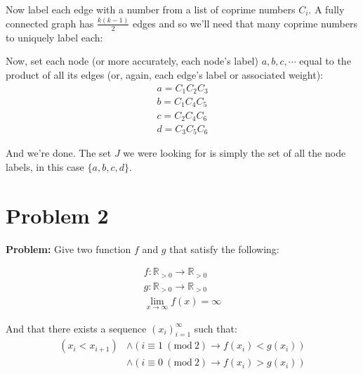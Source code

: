 \documentclass{article}
\newcommand{\Mod}[1]{\ (\mathrm{mod}\ #1)}
\begin{document}
Now label each edge with a number from a list of coprime numbers $C_i$. A fully connected graph has $\frac{k(k-1)}{2}$ edges and so we'll need that many coprime numbers to uniquely label each:

\begin{center}
\end{center}

Now, set each node (or more accurately, each node's label) $a,b,c,\cdots$ equal to the product of all its edges (or, again, each edge's label or associated weight):
\begin{gather*}
  a = C_1 C_2C_3 \\
  b = C_1 C_4C_5 \\
  c = C_2 C_4C_6 \\
  d = C_3 C_5C_6
\end{gather*}

And we're done. The set $J$ we were looking for is simply the set of all the node labels, in this case $\{a,b,c,d\}$.

\section{Problem 2}
\textbf{Problem:} Give two function $f$ and $g$ that satisfy the following:

\begin{gather*}
  f:\mathbb{R}_{>0}\to\mathbb{R}_{>0} \\
  g:\mathbb{R}_{>0}\to\mathbb{R}_{>0} \\
  \lim_{x\to\infty}f(x)=\infty
\end{gather*}

And that there exists a sequence $\left(x_i\right)_{i=1}^{\infty}$ such that:
\begin{align*}
\left(x_i<x_{i+1}\right)&\wedge\left(i\equiv 1\Mod{2}\rightarrow f(x_i)<g(x_i)\right)\\
&\wedge\left(i\equiv 0\Mod{2}\rightarrow f(x_i)>g(x_i)\right)
\end{align*}
\end{document}
